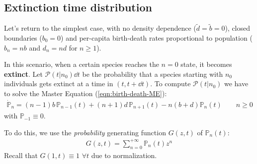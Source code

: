 \documentclass[../../main.tex]{subfiles}
\begin{document}
\subsection{Extinction time distribution}\label{sec:extintion-times}

Let's return to the simplest case, with no density dependence ($\tilde{d} = \tilde{b} = 0$), closed boundaries ($b_0 = 0$) and per-capita birth-death rates proportional to population ($b_n = n b$ and $d_n = n d$ for $n \geq 1$).

\medskip

In this scenario, when a certain species reaches the $n=0$ state, it becomes \textbf{extinct}. Let $\mathcal{P}(t|n_0)\dd{t}$ be the probability that a species starting with $n_0$ individuals gets extinct at a time in $(t, t+\dd{t})$.  To compute $\mathcal{P}(t|n_0)$ we have to solve the Master Equation (\ref{eqn:birth-death-ME}):
\begin{align}\label{eqn:birth-death-ME2}
    \dot{\mathbb{P}}_{n} = {(n-1)b\,\mathbb{P}_{n-1}(t)} + {(n+1)d\,\mathbb{P}_{n+1}(t) }- n(b+d) \mathbb{P}_n(t) \qquad n\geq 0
\end{align}
with $\mathbb{P}_{-1} \equiv 0$.

\medskip

To do this, we use the \textit{probability} generating function $G(z,t)$ of $\mathbb{P}_n(t)$:
\begin{align*}
    G(z,t) = \sum_{n=0}^{+\infty} \mathbb{P}_n(t) z^n 
\end{align*} 
Recall that $G(1,t) \equiv 1$ $\forall t$ due to normalization.

\medskip
\end{document}
